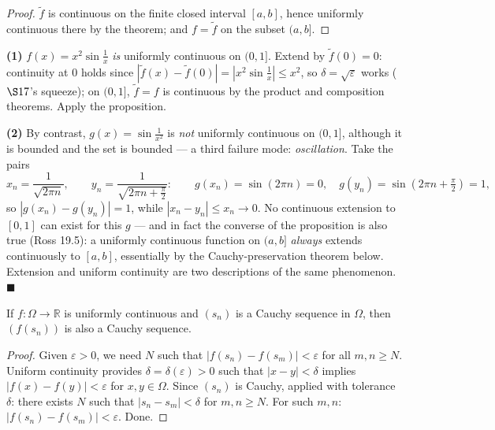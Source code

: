 \documentclass[11pt]{report}
\begin{document}
\begin{proof}
$\tilde f$ is continuous on the finite closed interval $[a,b]$, hence uniformly continuous there by the theorem; and $f = \tilde f$ on the subset $(a,b]$.
\end{proof}

\begin{exbox}
\textbf{(1)} $f(x) = x^2 \sin\tfrac1x$ \emph{is} uniformly continuous on $(0,1]$. Extend by $\tilde f(0) = 0$: continuity at $0$ holds since $|\tilde f(x) - \tilde f(0)| = |x^2 \sin\tfrac1x| \leq x^2$, so $\delta = \sqrt\varepsilon$ works ($\S 17$'s squeeze); on $(0,1]$, $\tilde f = f$ is continuous by the product and composition theorems. Apply the proposition.

\textbf{(2)} By contrast, $g(x) = \sin\tfrac{1}{x^2}$ is \emph{not} uniformly continuous on $(0,1]$, although it is bounded and the set is bounded --- a third failure mode: \emph{oscillation}. Take the pairs
\[
x_n = \frac{1}{\sqrt{2\pi n}}, \qquad y_n = \frac{1}{\sqrt{2\pi n + \tfrac\pi2}}:
\qquad g(x_n) = \sin(2\pi n) = 0, \quad g(y_n) = \sin\left(2\pi n + \tfrac\pi2\right) = 1,
\]
so $|g(x_n) - g(y_n)| = 1$, while $|x_n - y_n| \leq x_n \to 0$. No continuous extension to $[0,1]$ can exist for this $g$ --- and in fact the converse of the proposition is also true (Ross 19.5): a uniformly continuous function on $(a,b]$ \emph{always} extends continuously to $[a,b]$, essentially by the Cauchy-preservation theorem below. Extension and uniform continuity are two descriptions of the same phenomenon. \hfill $\blacksquare$
\end{exbox}

\begin{thmbox}
If $f: \Omega \to \mathbb{R}$ is uniformly continuous and $(s_n)$ is a Cauchy sequence in $\Omega$, then $(f(s_n))$ is also a Cauchy sequence.
\end{thmbox}

\begin{proof}
Given $\varepsilon > 0$, we need $N$ such that $|f(s_n) - f(s_m)| < \varepsilon$ for all $m, n \geq N$. Uniform continuity provides $\delta = \delta(\varepsilon) > 0$ such that $|x - y| < \delta$ implies $|f(x) - f(y)| < \varepsilon$ for $x, y \in \Omega$. Since $(s_n)$ is Cauchy, applied with tolerance $\delta$: there exists $N$ such that $|s_n - s_m| < \delta$ for $m, n \geq N$. For such $m, n$: $|f(s_n) - f(s_m)| < \varepsilon$. Done.
\end{proof}
\end{document}
